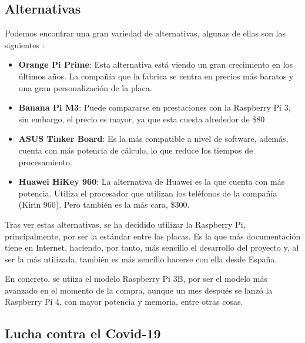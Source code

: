         \subsection{Alternativas} %
        \label{sub:AlternativasRaspberryPi}

            Podemos encontrar una gran variedad de alternativas, algunas de ellas son las
            siguientes \cite{alternativas_raspberry_pi}:

            \begin{itemize}
                \item \textbf{Orange Pi Prime}: Esta alternativa está viendo un gran crecimiento en los últimos años. La
                compañía que la fabrica se centra en precios más baratos y una gran personalización de la placa.
                \item \textbf{Banana Pi M3}: Puede compararse en prestaciones con la Raspberry Pi 3, sin embargo, el
                precio es mayor, ya que esta cuesta alrededor de \$80
                \item \textbf{ ASUS Tinker Board}: Es la más compatible a nivel de software, además, cuenta con más
                potencia de cálculo, lo que reduce los tiempos de procesamiento.
                \item \textbf{Huawei HiKey 960}: La alternativa de Huawei es la que cuenta con más potencia. Utiliza el
                procesador que utilizan los teléfonos de la compañía (Kirin 960). Pero también es la más cara, \$300.
            \end{itemize}

            Tras ver estas alternativas, se ha decidido utilizar la Raspberry Pi, principalmente, por ser la estándar
            entre las placas. Es la que más documentación tiene en Internet, haciendo, por tanto, más sencillo el
            desarrollo del proyecto y, al ser la más utilizada, también es más sencillo hacerse con ella desde
            España.

            En concreto, se utiiza el modelo Raspberry Pi 3B, por ser el modelo más avanzado en el momento de la compra,
            aunque un mes después se lanzó la Raspberry Pi 4, con mayor potencia y memoria, entre otras cosas.


        \subsection{Lucha contra el Covid-19} %
        \label{sub:LuchaContraElCovid-19}

